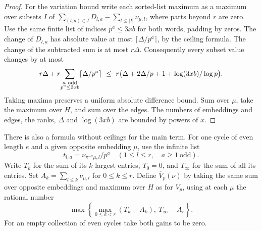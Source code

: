 \documentclass[a4paper,11pt]{article}
\theoremstyle{definition}
\theoremstyle{remark}
\numberwithin{equation}{section}
\begin{document}
\begin{proof}
For the variation bound write each sorted-list maximum as a
maximum over subsets \(I\) of
\(\sum_{(l,a)\in I}D_{l,a}-\sum_{l\le |I|}\nu_{\mu,l}\),
where parts beyond \(r\) are zero. Use the same finite list
of indices \(p^a\le3xb\) for both words, padding by zeros.
The change of \(D_{l,a}\) has absolute value at most
\(\lceil\Delta/p^a\rceil\), by the ceiling formula.
The change of the subtracted sum is at most \(r\Delta\).
Consequently every subset value changes by at most
\[
   r\Delta+
   r\!\sum_{\substack{a\ {\rm odd}\\p^a\le3xb}}
                  \lceil\Delta/p^a\rceil
     \ \le\ r\bigl(\Delta+2\Delta/p+1+\log(3xb)/\log p\bigr).
\]
Taking maxima preserves a uniform absolute difference bound.
Sum over \(\mu\), take the maximum over \(H\), and sum over the
edges. The numbers of embeddings and edges, the ranks,
\(\Delta\) and \(\log(3xb)\) are bounded by powers of \(x\).
\end{proof}

There is also a formula without ceilings for the main term.
For one cycle of even length \(e\) and a given opposite
embedding \(\mu\), use the infinite list
\[
             t_{l,a}=\nu_{\pi^{-a}\mu,l}/p^a
                \quad(1\le l\le r,\quad a\ge1\ \text{odd}).
\]
Write \(T_k\) for the sum of its \(k\) largest entries,
\(T_0=0\), and \(T_\infty\) for the sum of all its entries.
Set \(A_k=\sum_{l\le k}\nu_{\mu,l}\) for \(0\le k\le r\).
Define \(\overline V_p(\nu)\) by taking the same sum over
opposite embeddings and maximum over \(H\) as for \(V_p\),
using at each \(\mu\) the rational number
\[
       \max\left\{\max_{0\le k<r}(T_k-A_k),\
                                    T_\infty-A_r\right\}.
\]
For an empty collection of even cycles take both gains to be zero.
\end{document}
